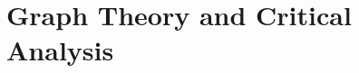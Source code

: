 
%
%
%
%
%
%
%
%
%



\section{Graph Theory and Critical Analysis}\label{Module1:GraphTheoryCriticalAnalysis}

